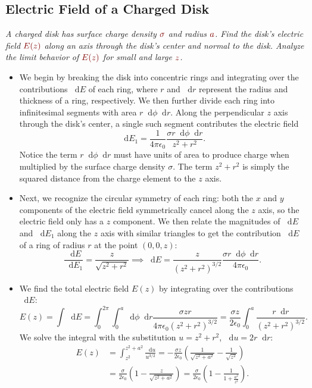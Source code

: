 \documentclass[11pt, a4paper]{article}
\newcommand{\diff}{\mathop{}\!\mathrm{d}} %
\newcommand{\dmath}[1]{\textcolor{Maroon}{#1}}  %
\newcommand{\ee}{\epsilon_{0}}  %
\begin{document}
\subsection{Electric Field of a Charged Disk}
\textit{A charged disk has surface charge density $ \dmath{\sigma} $ and radius $ \dmath{a} $. Find the disk's electric field $ \dmath{E(z)} $ along an axis through the disk's center and normal to the disk. Analyze the limit behavior of $ \dmath{E(z)} $ for small and large $ \dmath{z} $.}
\begin{itemize}
	\item We begin by breaking the disk into concentric rings and integrating over the contributions $ \diff E $ of each ring, where $ r $ and $ \diff r $ represent the radius and thickness of a ring, respectively. We then further divide each ring into infinitesimal segments with area $ r \diff \phi \diff r $. Along the perpendicular $ z $ axis through the disk's center, a single such segment contributes the electric field
	\begin{equation*}
		\diff E_{1} = \frac{1}{4\pi \ee} \frac{\sigma r\diff \phi \diff r }{z^{2} + r^{2}}.
	\end{equation*}
	Notice the term $ r\diff \phi \diff r $ must have units of area to produce charge when multiplied by the surface charge density $ \sigma $. The term $ z^{2} + r^{2} $ is simply the squared distance from the charge element to the $ z $ axis.
	
	\item Next, we recognize the circular symmetry of each ring: both the $ x $ and $ y $ components of the electric field symmetrically cancel along the $ z $ axis, so the electric field only has a $ z $ component. We then relate the magnitudes of $ \diff E $ and $ \diff E_{1} $ along the $ z $ axis with similar triangles to get the contribution $ \diff E $ of a ring of radius $ r $ at the point $ (0, 0, z) $:
	\begin{equation*}
		\frac{\diff E}{\diff E_{1}} = \frac{z}{\sqrt{z^{2} + r^{2}}} \implies  \diff E = \frac{z}{(z^{2} + r^{2})^{3/2}} \frac{\sigma r\diff \phi \diff r }{4\pi \ee}.
	\end{equation*}
	
    \item We find the total electric field $ E(z) $ by integrating over the contributions $ \diff E $:
	\begin{equation*}
		E(z) = \int \diff E = \int_{0}^{2\pi}\int_{0}^{a}\diff \phi \diff r \frac{\sigma z r}{4\pi \ee (z^{2} + r^{2})^{3/2}} = \frac{\sigma z}{2\ee} \int_{0}^{a}\frac{r \diff r}{(z^{2} + r^{2})^{3/2}}.
	\end{equation*}
	We solve the integral with the substitution $ u = z^{2} + r^{2} $, $\diff u = 2r \diff r $:
	\begin{align*}
		E(z) &= \int_{z^{2}}^{z^{2} + a^{2}} \frac{\diff u}{u^{3/2}} = -\frac{\sigma z}{2 \ee} \left(\frac{1}{\sqrt{z^{2} + a^{2}}} - \frac{1}{\sqrt{z^{2}}}\right)\\
		&=\frac{\sigma}{2\ee} \left(1 - \frac{z}{\sqrt{z^{2} + a^{2}}}\right) = \frac{\sigma}{2\ee} \left(1 - \frac{1}{1 + \frac{a^{2}}{z^{2}}}\right).
	\end{align*}
	

\end{itemize}
\end{document}

